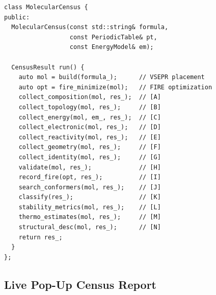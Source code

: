 \documentclass[11pt,a4paper]{article}
\begin{document}
\begin{lstlisting}[style=cpp,title={\textbf{MolecularCensus engine (simplified)}}]
class MolecularCensus {
public:
  MolecularCensus(const std::string& formula,
                  const PeriodicTable& pt,
                  const EnergyModel& em);

  CensusResult run() {
    auto mol = build(formula_);      // VSEPR placement
    auto opt = fire_minimize(mol);   // FIRE optimization
    collect_composition(mol, res_);  // [A]
    collect_topology(mol, res_);     // [B]
    collect_energy(mol, em_, res_);  // [C]
    collect_electronic(mol, res_);   // [D]
    collect_reactivity(mol, res_);   // [E]
    collect_geometry(mol, res_);     // [F]
    collect_identity(mol, res_);     // [G]
    validate(mol, res_);             // [H]
    record_fire(opt, res_);          // [I]
    search_conformers(mol, res_);    // [J]
    classify(res_);                  // [K]
    stability_metrics(mol, res_);    // [L]
    thermo_estimates(mol, res_);     // [M]
    structural_desc(mol, res_);      // [N]
    return res_;
  }
};
\end{lstlisting}

\subsection{Live Pop-Up Census Report}
\end{document}
